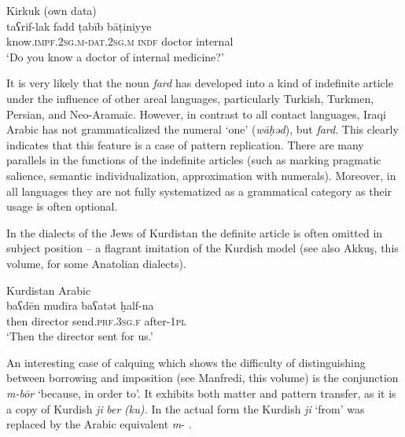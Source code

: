 \documentclass[output=paper]{langsci/langscibook}
\begin{document}
\ea\label{fadd} 
{Kirkuk (own data)}\\
\gll taʕrif-lak fadd ṭabīb bāṭiniyye\\
     know.\textsc{impf.2sg.m-dat.2sg.m} \textsc{indf} doctor internal \\
\glt ‘Do you know a doctor of internal medicine?'
\z

It is very likely that the noun \textit{fard} has developed into a kind of indefinite article under the influence of other areal languages, particularly Turkish, Turkmen, Persian, and Neo-Aramaic. However, in contrast to all contact languages, Iraqi Arabic has not grammaticalized the numeral ‘one’ (\textit{wāḥəd}), but \textit{fard}. This clearly indicates that this feature is a case of pattern replication. There are many parallels in the functions of the indefinite articles (such as marking pragmatic salience, semantic individualization, approximation with numerals). Moreover, in all languages they are not fully systematized as a grammatical category as their usage is often optional. 

In the dialects of the Jews of Kurdistan the definite article is often omitted in subject position – a flagrant imitation of the Kurdish model (see also Akkuş, this volume, for some Anatolian dialects).

\ea\label{ex:prochazka:} 
{Kurdistan Arabic \citep[71]{Jastrow1990chapter}} \\
\gll baʕdēn mudīra baʕatət ḫalf-na\\
     then director send.\textsc{prf.3sg.f} after-\textsc{1pl}\\
\glt ‘Then the director sent for us.’
\z

An interesting case of calquing which shows the difficulty of distinguishing between borrowing and imposition (see Manfredi, this volume) is the conjunction \textit{m-bōr} ‘because, in order to’. It exhibits both matter and pattern transfer, as it is a copy of Kurdish \textit{ji} \textit{ber} \textit{(ku).} In the actual form the Kurdish \textit{ji} ‘from’ was replaced by the Arabic equivalent \textit{m}{}- \citep[64]{Jastrow1979}. 
\end{document}
